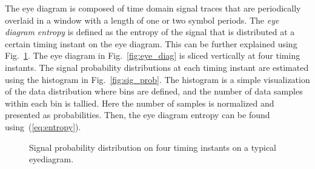 \documentclass[12pt, draftclsnofoot, onecolumn]{IEEEtran}
\begin{document}
The eye diagram is composed of time domain signal traces that are periodically overlaid in a window with a length of one or two symbol periods.
The \textit{eye diagram entropy} is defined as the entropy of the signal that is distributed at a certain timing instant on the eye diagram. 
This can be further explained using Fig.~\ref{fig:eye_ent}.
The eye diagram in Fig.~\ref{fig:eye_diag} is sliced vertically at four timing instants.
The signal probability distributions at each timing instant are estimated using the histogram in Fig.~\ref{fig:sig_prob}.
The histogram is a simple visualization of the data distribution where bins are defined, and the number of data samples within each bin is tallied. 
Here the number of samples is normalized and presented as probabilities.
Then, the eye diagram entropy can be found using~(\ref{eq:entropy}). 
\begin{figure}[htbp]
\centering
{}
\caption{Signal probability distribution on four timing instants on a typical eyediagram.}
\label{fig:eye_ent} %
\end{figure}
\end{document}
